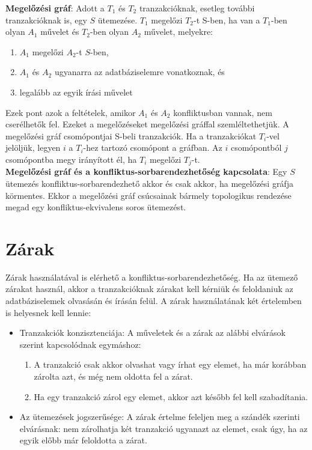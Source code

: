 \documentclass[12pt,margin=0px]{article}
\begin{document}
	\noindent \textbf{Megelőzési gráf}: Adott a $T_{1}$ és $T_{2}$ tranzakcióknak, esetleg további tranzakcióknak is, egy $S$ ütemezése.
	$T_{1}$ megelőzi $T_{2}$-t S-ben, ha van a $T_{1}$-ben olyan $A_{1}$ művelet és $T_{2}$-ben olyan $A_{2}$ művelet, melyekre:
	\begin{enumerate}
		\item	$A_{1}$ megelőzi $A_{2}$-t $S$-ben,
		\item	$A_{1}$ és $A_{2}$ ugyanarra az adatbáziselemre vonatkoznak, és
		\item	legalább az egyik írási művelet
	\end{enumerate}
	Ezek pont azok a feltételek, amikor $A_{1}$ és $A_{2}$ konfliktusban vannak, nem cserélhetők fel. Ezeket a megelőzéseket megelőzési
	gráffal szemléltethetjük. A megelőzési gráf csomópontjai S-beli tranzakciók. Ha a tranzakciókat $T_{i}$-vel jelöljük, legyen $i$
	a $T_{i}$-hez tartozó csomópont a gráfban. Az $i$ csomópontból $j$ csomópontba megy irányított él, ha $T_{i}$ megelőzi $T_{j}$-t.\\
	
	\noindent \textbf{Megelőzési gráf és a konfliktus-sorbarendezhetőség kapcsolata}: Egy $S$ ütemezés konfliktus-sorbarendezhető
	akkor és csak akkor, ha megelőzési gráfja körmentes. Ekkor a megelőzési gráf csúcsainak bármely topologikus rendezése megad
	egy konfliktus-ekvivalens soros ütemezést.
	
	\section*{Zárak}
	
	Zárak használatával is elérhető a konfliktus-sorbarendezhetőség. Ha az ütemező zárakat használ, akkor a tranzakcióknak zárakat
	kell kérniük és feloldaniuk az adatbáziselemek olvasásán és írásán felül. A zárak használatának két értelemben is helyesnek kell
	lennie:
	
	\begin{itemize}
		\item	Tranzakciók konzisztenciája: A műveletek és a zárak az alábbi elvárások szerint kapcsolódnak egymáshoz:
		\begin{enumerate}
			\item	A tranzakció csak akkor olvashat vagy írhat egy elemet, ha már korábban zárolta azt, és még nem oldotta
			fel a zárat.

			\item	Ha egy tranzakció zárol egy elemet, akkor azt később fel kell szabadítania.
		\end{enumerate}
		
		\item	Az ütemezések jogszerűsége: A zárak értelme feleljen meg a szándék szerinti elvárásnak: nem zárolhatja két tranzakció
		ugyanazt az elemet, csak úgy, ha az egyik előbb már feloldotta a zárat.
	\end{itemize}
	
\end{document}
